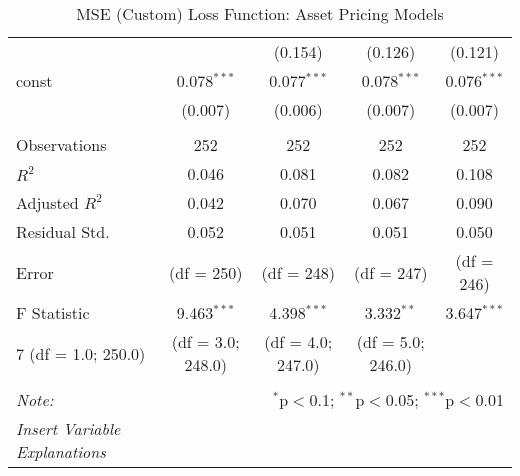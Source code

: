 \begin{table}[H]
\begin{tabular}{@{\extracolsep{5pt}}lcccc}
                      &                                                                                  & (0.154)           & (0.126)           & (0.121)        \\
    const             & 0.078$^{***}$                                                                    & 0.077$^{***}$     & 0.078$^{***}$     & 0.076$^{***}$  \\
                      & (0.007)                                                                          & (0.006)           & (0.007)           & (0.007)        \\
    \hline                                                                                                                                                        \\[-1.8ex]
    Observations      & 252                                                                              & 252               & 252               & 252            \\
    $R^2$             & 0.046                                                                            & 0.081             & 0.082             & 0.108          \\
    Adjusted $R^2$    & 0.042                                                                            & 0.070             & 0.067             & 0.090          \\
    Residual Std.     & 0.052                                                                            & 0.051             & 0.051             & 0.050          \\
    Error             & (df = 250)                                                                       & (df = 248)        & (df = 247)        & (df = 246)     \\
    F Statistic       & 9.463$^{***}$                                                                    & 4.398$^{***}$     & 3.332$^{**}$      & 3.647$^{***}$  \\
    7 (df = 1.0; 250.0) & (df = 3.0; 248.0)                                                                & (df = 4.0; 247.0) & (df = 5.0; 246.0)                  \\
    \hline
    \hline                                                                                                                                                        \\[-1.8ex]
    \textit{Note:}    & \multicolumn{4}{r}{$^{*}$p$<$0.1; $^{**}$p$<$0.05; $^{***}$p$<$0.01}                                                                      \\
    \textit{Insert Variable Explanations}                                                                                                                         \\
  \end{tabular}
  \caption{MSE (Custom) Loss Function: Asset Pricing Models}
  \label{mse-apm}
\end{table}




